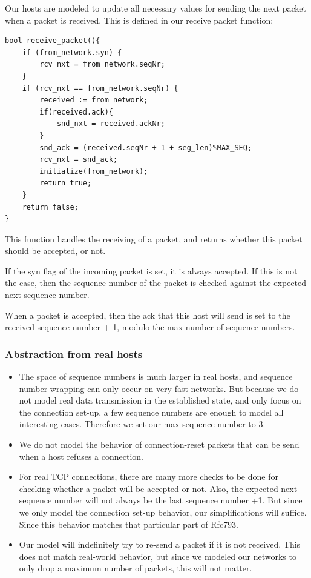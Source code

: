 \documentclass[twocolumn]{article}
\begin{document}
Our hosts are modeled to update all necessary values for sending the next packet when a packet is received. This is defined in our receive packet function:
\begin{verbatim}
bool receive_packet(){
	if (from_network.syn) {
		rcv_nxt = from_network.seqNr;
	}
	if (rcv_nxt == from_network.seqNr) {
		received := from_network;
		if(received.ack){
			snd_nxt = received.ackNr;
		}
		snd_ack = (received.seqNr + 1 + seg_len)%MAX_SEQ;
		rcv_nxt = snd_ack;
		initialize(from_network);
		return true;
	}
	return false;
}
\end{verbatim}

This function handles the receiving of a packet, and returns whether this packet should be accepted, or not.

If the syn flag of the incoming packet is set, it is always accepted. If this is not the case, then the sequence number of the packet is checked against the expected next sequence number.

When a packet is accepted, then the ack that this host will send is set to the received sequence number + 1, modulo the max number of sequence numbers.


\subsubsection{Abstraction from real hosts}
\begin{itemize}
\item The space of sequence numbers is much larger in real hosts, and sequence number wrapping can only occur on very fast networks. But because we do not model real data transmission in the established state, and only focus on the connection set-up, a few sequence numbers are enough to model all interesting cases. Therefore we set our max sequence number to 3.
\item We do not model the behavior of connection-reset packets that can be send when a host refuses a connection.
\item For real TCP connections, there are many more checks to be done for checking whether a packet will be accepted or not. Also, the expected next sequence number will not always be the last sequence number +1. But since we only model the connection set-up behavior, our simplifications will suffice. Since this behavior matches that particular part of Rfc793.
\item Our model will indefinitely try to re-send a packet if it is not received. This does not match real-world behavior, but since we modeled our networks to only drop a maximum number of packets, this will not matter.
\end{itemize}
\end{document}
